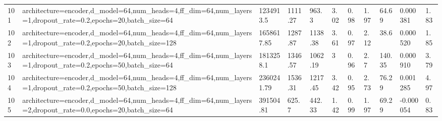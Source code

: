 \begin{longtable}{C{0.8cm} L{2cm} C{1.15cm} C{1.15cm} C{1.15cm} C{1.15cm} C{0.85cm} C{1.25cm} C{1.2cm} C{1.5cm} C{1.0cm}}
101 & architecture=encoder,\newline d\_model=64,\newline num\_heads=4,\newline ff\_dim=64,\newline num\_layers=1,\newline dropout\_rate=0.2,\newline epochs=20,\newline batch\_size=64 & 1234913.5 & 1111.27 & 963.3 & 3.02 & 0.98 & 1.97 & 64.69 & 0.000381 & 1.83 \\
102 & architecture=encoder,\newline d\_model=64,\newline num\_heads=4,\newline ff\_dim=64,\newline num\_layers=1,\newline dropout\_rate=0.2,\newline epochs=20,\newline batch\_size=128 & 1658617.85 & 1287.87 & 1138.38 & 3.61 & 0.97 & 2.12 & 38.6 & 0.000520 & 1.85 \\
103 & architecture=encoder,\newline d\_model=64,\newline num\_heads=4,\newline ff\_dim=64,\newline num\_layers=1,\newline dropout\_rate=0.2,\newline epochs=50,\newline batch\_size=64 & 1813258.1 & 1346.57 & 1062.19 & 3 & 0.96 & 2.7 & 140.35 & 0.000910 & 3.79 \\
104 & architecture=encoder,\newline d\_model=64,\newline num\_heads=4,\newline ff\_dim=64,\newline num\_layers=1,\newline dropout\_rate=0.2,\newline epochs=50,\newline batch\_size=128 & 2360241.79 & 1536.31 & 1217.45 & 3.42 & 0.95 & 2.73 & 76.29 & 0.001285 & 4.97 \\
105 & architecture=encoder,\newline d\_model=64,\newline num\_heads=4,\newline ff\_dim=64,\newline num\_layers=2,\newline dropout\_rate=0.0,\newline epochs=20,\newline batch\_size=64 & 391504.81 & 625.7 & 442.33 & 1.42 & 0.99 & 1.97 & 69.29 & -0.000054 & 0.83 \\

\end{longtable}
